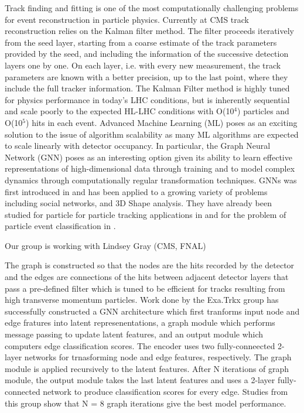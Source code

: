 \documentclass[preprint,12pt]{elsarticle}
\begin{document}
Track finding and fitting is one of the most computationally challenging 
problems for event reconstruction in particle physics.
Currently at CMS track reconstruction relies on the Kalman filter method. 
The filter proceeds iteratively from the seed layer, starting from a coarse estimate of 
the track parameters provided by the seed, and including the
information of the successive detection layers one by one. 
On each layer, i.e. with every new measurement, the track parameters 
are known with a better precision, up to the last point, where they 
include the full tracker information.
The Kalman Filter method is highly tuned for physics performance in today’s LHC 
conditions, but is inherently sequential and scale poorly to the 
expected HL-LHC conditions with O(10$^{4}$) particles and O(10$^{5}$) hits 
in each event. %
Advanced Machine Learning (ML) poses as an exciting solution to the issue of 
algorithm scalability as many ML algorithms are expected to scale linearly %
with detector occupancy.
In particular, the Graph Neural Network (GNN) poses as an interesting option
given its ability to learn effective representations of high-dimensional data 
through training and to model complex dynamics through computationally regular 
transformation techniques.
GNNs was first introduced in \cite{GNN_first}
and has been applied to a growing variety of problems including social networks,
and 3D Shape analysis. They have already been studied for particle for particle tracking
applications in \cite{GNN_particletracking1,GNN_particletracking2} and for the problem
of particle event classification in \cite{GNN_ec_1, GNN_ec_2, GNN_ec_3}.

Our group is working with Lindsey Gray (CMS, FNAL)

The graph is constructed so that the nodes are the hits recorded by the detector and the 
edges are connections of the hits between adjacent detector layers that pass a pre-defined
filter which is tuned to be efficient for tracks resulting from high transverse momentum
particles. Work done by the Exa.Trkx group %
has successfully constructed a GNN architecture which first tranforms input node and edge
fratures into latent represenentations, a graph module which performs message passing to
update latent features, and an output module which computers edge classification scores.
The encoder uses two fully-conneected 2-layer networks for trnasforming node and edge
features, respectively. The graph module is applied recursively to the latent features.
After N iterations of graph module, the output module takes the last latent features
and uses a 2-layer fully-connected network to produce classification scores for every
edge. Studies from this group show that N = 8 graph iterations give the best model
performance.
\end{document}
